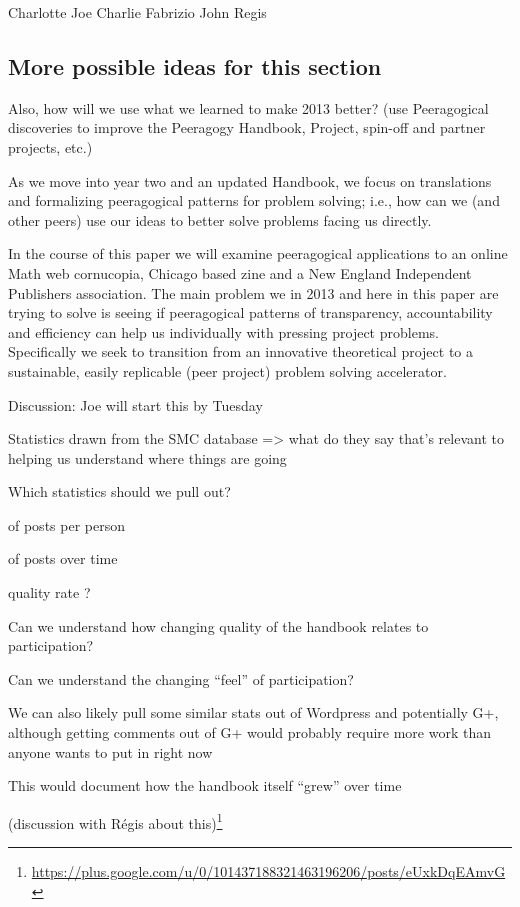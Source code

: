 \documentclass[twoside]{article}
\begin{document}
\begin{multicols}{2}
Charlotte
Joe
Charlie
Fabrizio
John
Regis

\subsection{More possible ideas for this section}

Also, how will we use what we learned to make 2013 better? (use
Peeragogical discoveries to improve the Peeragogy Handbook, Project,
spin-off and partner projects, etc.)

As we move into year two and an updated Handbook, we focus on translations and formalizing peeragogical patterns for problem solving; i.e., how can we (and other peers) use our ideas to better solve problems facing us directly.

In the course of this paper we will examine peeragogical applications to an online Math web cornucopia, Chicago based zine and a New England Independent Publishers association. The main problem we in 2013 and here in this paper are trying to solve is seeing if peeragogical patterns of transparency, accountability and efficiency can help us individually with pressing project problems. Specifically we seek to transition from an innovative theoretical project to a sustainable, easily replicable (peer project) problem solving accelerator.

Discussion: Joe will start this by Tuesday

    Statistics drawn from the SMC database => what do they say that's relevant to helping us understand where things are going

        Which statistics should we pull out?

             of posts per person

             of posts over time

             quality rate ?

                Can we understand how changing quality of the handbook relates to participation?

                Can we understand the changing ``feel'' of participation?

        We can also likely pull some similar stats out of Wordpress and potentially G+, although getting comments out of G+ would probably require more work than anyone wants to put in right now

            This would document how the handbook itself ``grew'' over time

            (discussion with R\'egis about this)\footnote{\url{https://plus.google.com/u/0/101437188321463196206/posts/eUxkDqEAmvG}}



\end{multicols}
\end{document}

